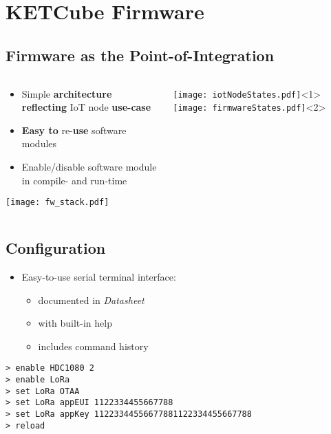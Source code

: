 \section{KETCube Firmware}
\subsection{Firmware as the Point-of-Integration}

\begin{frame}%
  \centering
      
    \begin{columns}
      \begin{column}{0.6\paperwidth}
         \centering
         \begin{itemize}
           \item Simple {\bf architecture reflecting} IoT node {\bf use-case}
           \item {\bf Easy to} re-{\bf use} software modules
           \item Enable/disable software module in compile- and run-time
         \end{itemize}
         \vfill
         \texttt{[image: fw\_stack.pdf]}
      \end{column}
      \begin{column}{0.4\paperwidth}
           \texttt{[image: iotNodeStates.pdf]}<1>
           \texttt{[image: firmwareStates.pdf]}<2>
       \end{column}
    \end{columns}
  
\end{frame}

\subsection{Configuration}

\begin{frame}[fragile]%
  \centering
    
\begin{itemize}
  \item Easy-to-use serial terminal interface:
  \begin{itemize}
    \item documented in {\it Datasheet}
    \item with built-in help
    \item includes command history
  \end{itemize}
\end{itemize}

\vspace{1cm}
    
  \begin{Verbatim}[frame=single, fontsize=\scriptsize]
> enable HDC1080 2
> enable LoRa
> set LoRa OTAA
> set LoRa appEUI 1122334455667788
> set LoRa appKey 11223344556677881122334455667788
> reload
 \end{Verbatim}
 
  
\end{frame}

